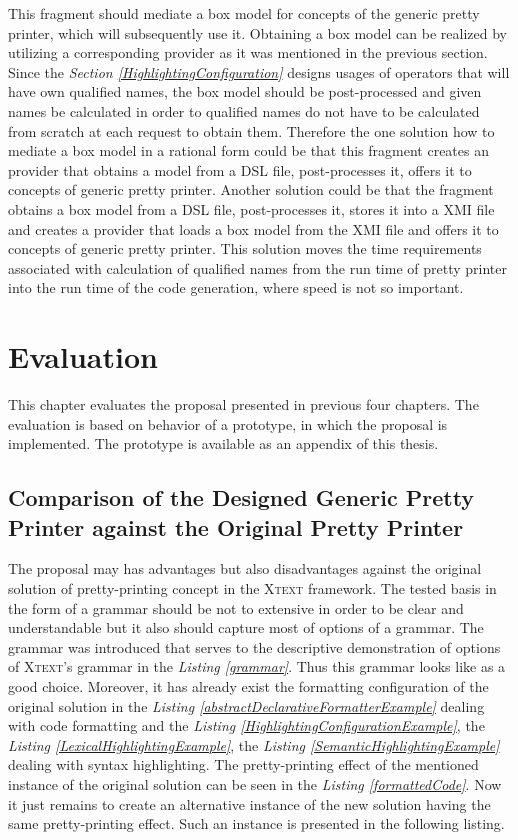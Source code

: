 \documentclass[12pt,notitlepage,a4paper]{report}
\begin{document}
This fragment should mediate a box model for concepts of the generic pretty printer, which will subsequently use it. Obtaining a box model can be realized by utilizing a corresponding provider as it was mentioned in the previous section. Since the \textit{Section \ref{HighlightingConfiguration}} designs usages of operators that will have own qualified names, the box model should be post-processed and given names be calculated in order to qualified names do not have to be calculated from scratch at each request to obtain them. Therefore the one solution how to mediate a box model in a rational form could be that this fragment creates an provider that obtains a model from a DSL file, post-processes it, offers it to concepts of generic pretty printer. Another solution could be that the fragment obtains a box model from a DSL file, post-processes it, stores it into a XMI file \cite{XMI} and creates a provider that loads a box model from the XMI file and offers it to concepts of generic pretty printer. This solution moves the time requirements associated with calculation of qualified names from the run time of pretty printer into the run time of the code generation, where speed is not so important.


\chapter{Evaluation}

This chapter evaluates the proposal presented in previous four chapters. The evaluation is based on behavior of a prototype, in which the proposal is implemented. The prototype is available as an appendix of this thesis.  

\section{Comparison of the Designed Generic Pretty Printer against the Original Pretty Printer}\label{SolutionComparision}
The proposal may has advantages but also disadvantages against the original solution of pretty-printing concept in the \textsc{Xtext} framework. The tested basis in the form of a grammar should be not to extensive in order to be clear and understandable but it also should capture most of options of a grammar. The grammar was introduced that serves to the descriptive demonstration of options  of \textsc{Xtext}'s grammar in the \textit{Listing \ref{grammar}}. Thus this grammar looks like as a good choice. Moreover, it has already exist the formatting configuration of the original solution in the \textit{Listing \ref{abstractDeclarativeFormatterExample}} dealing with code formatting  and the \textit{Listing \ref{HighlightingConfigurationExample}}, the \textit{Listing \ref{LexicalHighlightingExample}}, the \textit{Listing \ref{SemanticHighlightingExample}} dealing with syntax highlighting. The pretty-printing effect of the mentioned instance of the original solution can be seen in the \textit{Listing \ref{formattedCode}}. Now it just remains to create an alternative instance of the new solution having the same pretty-printing effect. Such an instance is presented in the following listing.
\end{document}

